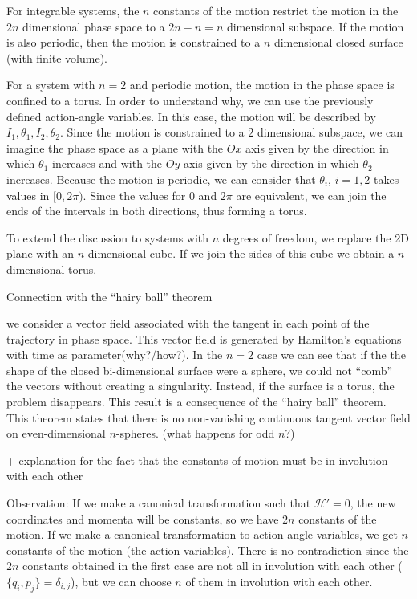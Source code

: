 \documentclass[../thesis.tex]{subfiles}
\theoremstyle{plain}
\begin{document}
For integrable systems, the \(n\) constants of the motion restrict the motion in the
\(2n\) dimensional phase space to a \(2n-n=n\) dimensional subspace. If the motion is
also periodic, then the motion is constrained to a \(n\) dimensional closed surface
(with finite volume).

For a system with \(n=2\) and periodic motion, the motion in the phase space is confined
to a torus. In order to understand why, we can use the previously defined action-angle variables.
In this case, the motion will be described by \(I_1, \theta_1, I_2, \theta_2\).
Since the motion is constrained to a \(2\) dimensional subspace, we can imagine the phase space
as a plane with the \(Ox\) axis given by the direction in which \(\theta_1\) increases and
with the \(Oy\) axis given by the direction in which \(\theta_2\) increases. Because the motion
is periodic, we can consider that \(\theta_i\), \(i=1,2\) takes values in \([0,2\pi)\).
Since the values for \(0\) and \(2\pi \) are equivalent, we can join the ends of the
intervals in both directions, thus forming a torus.

To extend the discussion to systems with \(n\) degrees of freedom,
we replace the 2D plane with an \(n\) dimensional cube. If we join the sides of
this cube we obtain a \(n\) dimensional torus.

{\color{red}Connection with the ``hairy ball'' theorem

we consider a vector field associated with the tangent in each point of the trajectory
in phase space. This vector field is generated by Hamilton's equations with time
as parameter{\color{red}(why?/how?)}.
In the \(n=2\) case we can see that if the the shape of the closed bi-dimensional
surface were a sphere, we could not ``comb'' the vectors without creating a singularity.
Instead, if the surface is a torus, the problem disappears. This result is a consequence of
the ``hairy ball'' theorem. This theorem states that there is no non-vanishing continuous
tangent vector field on even-dimensional $n$-spheres. (what happens for odd $n$?)
}

{\color{red}+ explanation for the fact that the constants of motion must be
in involution with each other

Observation:
If we make a canonical transformation such that \(\mathcal{H'} = 0\), the new
coordinates and momenta will be constants, so we have \(2n\) constants of the motion.
If we make a canonical transformation to action-angle variables, we get
\(n\) constants of the motion (the action variables).
There is no contradiction since the \(2n\) constants obtained in the first case
are not all in involution with each other (\( \{q_i,p_j\}=\delta_{i,j} \)), but
we can choose \(n\) of them in involution with each other.
}
\end{document}
